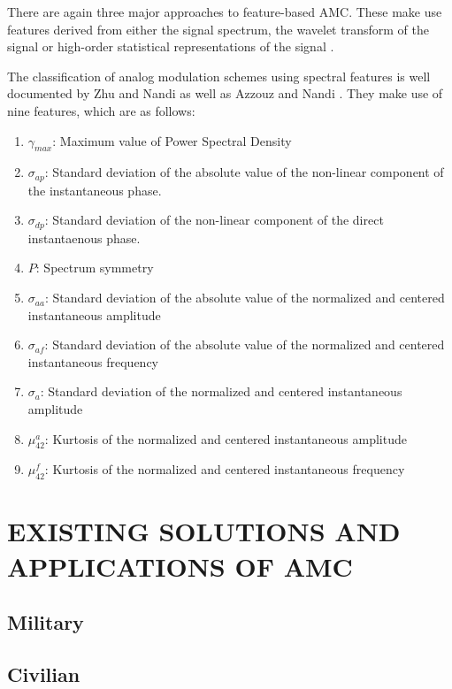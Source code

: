 \documentclass[10pt,twocolumn]{witseiepaper}
\begin{document}
	There are again three major approaches to feature-based AMC. These make use features derived from either the signal spectrum, the wavelet transform of the signal or high-order statistical representations of the signal \cite{zhu2014automatic}. 
	
	The classification of analog modulation schemes using spectral features is well documented by Zhu and Nandi \cite{zhu2014automatic} as well as Azzouz and Nandi \cite{azzouz2013automatic}. They make use of nine features, which are as follows:

	\begin{enumerate}
		\item $\gamma_{max}$: Maximum value of Power Spectral Density 
		\item $\sigma_{ap}$: Standard deviation of the absolute value of the non-linear component of the instantaneous phase.
		\item $\sigma_{dp}$: Standard deviation of the non-linear component of the direct instantaenous phase.
		\item $P$: Spectrum symmetry
		\item $\sigma_{aa}$: Standard deviation of the absolute value of the normalized and centered instantaneous amplitude
		\item $\sigma_{af}$: Standard deviation of the absolute value of the normalized and centered instantaneous frequency
		\item $\sigma_{a}$: Standard deviation of the normalized and centered instantaneous amplitude
		\item $\mu_{42}^{a}$: Kurtosis of the normalized and centered instantaneous amplitude
		\item $\mu_{42}^{f}$: Kurtosis of the normalized and centered instantaneous frequency
	\end{enumerate}
	

\section{EXISTING SOLUTIONS AND APPLICATIONS OF AMC}
	\subsection{Military}
	\subsection{Civilian}
\end{document}
